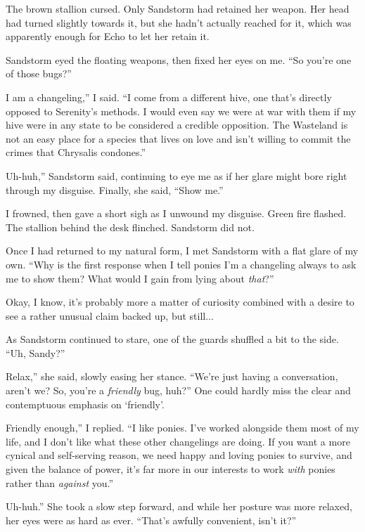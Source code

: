 The brown stallion cursed. Only Sandstorm had retained her weapon. Her head had turned slightly towards it, but she hadn’t actually reached for it, which was apparently enough for Echo to let her retain it.

Sandstorm eyed the floating weapons, then fixed her eyes on me. “So you’re one of those bugs?”

\leavevmode{}I am a changeling,” I said. “I come from a different hive, one that’s directly opposed to Serenity’s methods. I would even say we were at war with them if my hive were in any state to be considered a credible opposition. The Wasteland is not an easy place for a species that lives on love and isn’t willing to commit the crimes that Chrysalis condones.”

\leavevmode{}Uh-huh,” Sandstorm said, continuing to eye me as if her glare might bore right through my disguise. Finally, she said, “Show me.”

I frowned, then gave a short sigh as I unwound my disguise. Green fire flashed. The stallion behind the desk flinched. Sandstorm did not.

Once I had returned to my natural form, I met Sandstorm with a flat glare of my own. “Why is the first response when I tell ponies I’m a changeling always to ask me to show them? What would I gain from lying about \textit{that}?”

Okay, I know, it’s probably more a matter of curiosity combined with a desire to see a rather unusual claim backed up, but still...

As Sandstorm continued to stare, one of the guards shuffled a bit to the side. “Uh, Sandy?”

\leavevmode{}Relax,” she said, slowly easing her stance. “We’re just having a conversation, aren’t we? So, you’re a \textit{friendly} bug, huh?” One could hardly miss the clear and contemptuous emphasis on ‘friendly’.

\leavevmode{}Friendly enough,” I replied. “I like ponies. I’ve worked alongside them most of my life, and I don’t like what these other changelings are doing. If you want a more cynical and self-serving reason, we need happy and loving ponies to survive, and given the balance of power, it’s far more in our interests to work \textit{with} ponies rather than \textit{against} you.”

\leavevmode{}Uh-huh.” She took a slow step forward, and while her posture was more relaxed, her eyes were as hard as ever. “That’s awfully convenient, isn’t it?”


